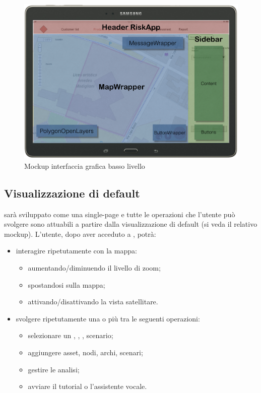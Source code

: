 \begin{figure}[H]
	\centering
	\includegraphics[scale=0.4]{img/MockUp/MockupConLayerLow}
	\caption{Mockup interfaccia grafica basso livello}
\end{figure}

\subsection{Visualizzazione di default}
\progetto{} sarà sviluppato come una single-page e tutte le operazioni che l'utente può svolgere sono attuabili a partire dalla visualizzazione di default (si veda il relativo mockup).
L'utente, dopo aver acceduto a \progetto, potrà:
\begin{itemize}
	\item interagire ripetutamente con la mappa:
		\begin{itemize}
			\item aumentando/diminuendo il livello di zoom;
			\item spostandosi sulla mappa;
			\item attivando/disattivando la vista satellitare.
		\end{itemize}
	\item svolgere ripetutamente una o più tra le seguenti operazioni:
	\begin{itemize}
		\item selezionare un , , , scenario;
		\item aggiungere asset, nodi, archi, scenari;
		\item gestire le analisi;
		\item avviare il tutorial o l'assistente vocale.
	\end{itemize}
\end{itemize} 



